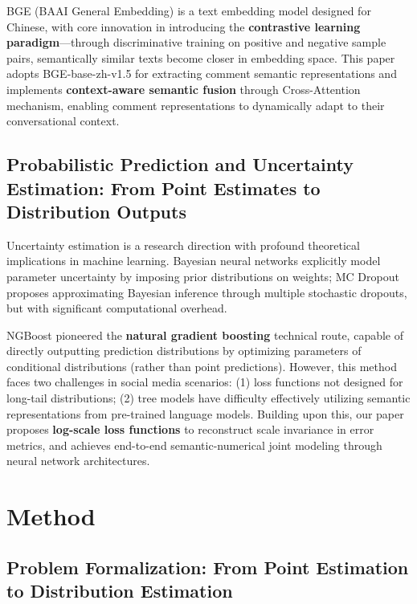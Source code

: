 \documentclass[10pt]{article}
\begin{document}
BGE (BAAI General Embedding)\cite{bge2023} is a text embedding model designed for Chinese, with core innovation in introducing the \textbf{contrastive learning paradigm}---through discriminative training on positive and negative sample pairs, semantically similar texts become closer in embedding space. This paper adopts BGE-base-zh-v1.5 for extracting comment semantic representations and implements \textbf{context-aware semantic fusion} through Cross-Attention mechanism, enabling comment representations to dynamically adapt to their conversational context.

\subsection{Probabilistic Prediction and Uncertainty Estimation: From Point Estimates to Distribution Outputs}

Uncertainty estimation is a research direction with profound theoretical implications in machine learning\cite{gal2016uncertainty}. Bayesian neural networks\cite{blundell2015weight} explicitly model parameter uncertainty by imposing prior distributions on weights; MC Dropout\cite{gal2016dropout} proposes approximating Bayesian inference through multiple stochastic dropouts, but with significant computational overhead.

NGBoost\cite{duan2020ngboost} pioneered the \textbf{natural gradient boosting} technical route, capable of directly outputting prediction distributions by optimizing parameters of conditional distributions (rather than point predictions). However, this method faces two challenges in social media scenarios: (1) loss functions not designed for long-tail distributions; (2) tree models have difficulty effectively utilizing semantic representations from pre-trained language models. Building upon this, our paper proposes \textbf{log-scale loss functions} to reconstruct scale invariance in error metrics, and achieves end-to-end semantic-numerical joint modeling through neural network architectures.

\section{Method}

\subsection{Problem Formalization: From Point Estimation to Distribution Estimation}
\end{document}
